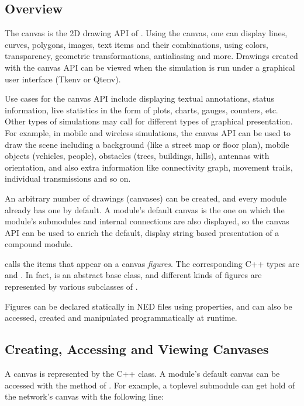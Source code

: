 \subsection{Overview}
\label{sec:graphics:canvas-overview}

The canvas is the 2D drawing API of {\opp}. Using the canvas, one can
display lines, curves, polygons, images, text items and their combinations,
using colors, transparency, geometric transformations, antialiasing and
more. Drawings created with the canvas API can be viewed when the simulation
is run under a graphical user interface (Tkenv or Qtenv).

Use cases for the canvas API include displaying textual annotations,
status information, live statistics in the form of plots, charts, gauges,
counters, etc. Other types of simulations may call for different types of
graphical presentation. For example, in mobile and wireless simulations,
the canvas API can be used to draw the scene including a background (like a
street map or floor plan), mobile objects (vehicles, people), obstacles
(trees, buildings, hills), antennas with orientation, and also extra
information like connectivity graph, movement trails, individual
transmissions and so on.

An arbitrary number of drawings (canvases) can be created, and every module
already has one by default. A module's default canvas is the one on which
the module's submodules and internal connections are also displayed, so the
canvas API can be used to enrich the default, display string based
presentation of a compound module.

{\opp} calls the items that appear on a canvas \textit{figures}. The
corresponding C++ types are  and . In fact,
 is an abstract base class, and different kinds of figures
are represented by various subclasses of .

Figures can be declared statically in NED files using 
properties, and can also be accessed, created and manipulated
programmatically at runtime.


\subsection{Creating, Accessing and Viewing Canvases}
\label{sec:graphics:creating-accessing-and-viewing-canvases}

A canvas is represented by the  C++ class. A module's
default canvas can be accessed with the  method of
. For example, a toplevel submodule can get hold of the
network's canvas with the following line:

